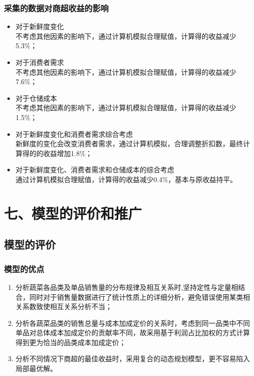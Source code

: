 \documentclass{my_paper}
\begin{document}
\subsubsection{采集的数据对商超收益的影响}
\begin{itemize}
    \item 对于新鲜度变化\\不考虑其他因素的影响下，通过计算机模拟合理赋值，计算得的收益减少5.3\%；
    \item 对于消费者需求\\不考虑其他因素的影响下，通过计算机模拟合理赋值，计算得的收益减少7.6\%；
    \item 对于仓储成本\\不考虑其他因素的影响下，通过计算机模拟合理赋值，计算得的收益减少1.5\%；
    \item 对于新鲜度变化和消费者需求综合考虑\\新鲜度的变化会改变消费者需求，通过计算机模拟，合理调整折扣数，最终计算得的的收益增加1.8\%；
    \item 对于新鲜度变化、消费者需求和仓储成本的综合考虑\\通过计算机模拟合理赋值，计算得的收益减少0.4\%，基本与原收益持平。
\end{itemize}







\section{七、模型的评价和推广}
\subsection{模型的评价}
\subsubsection{模型的优点}
\begin{enumerate}
    \item 分析蔬菜各品类及单品销售量的分布规律及相互关系时,坚持定性与定量相结合，同时对于销售量数据进行了统计性质上的详细分析，避免错误使用某类相关系数致使相互关系分析不当；
    \item 分析各蔬菜品类的销售总量与成本加成定价的关系时，考虑到同一品类中不同单品对总体成本加成定价的贡献率不同，故采用基于利润占比加权的方式计算得到更为恰当的品类成本加成定价；
    \item 分析不同情况下商超的最佳收益时，采用复合的动态规划模型，更不容易陷入局部最优解。
\end{enumerate}
\end{document}
